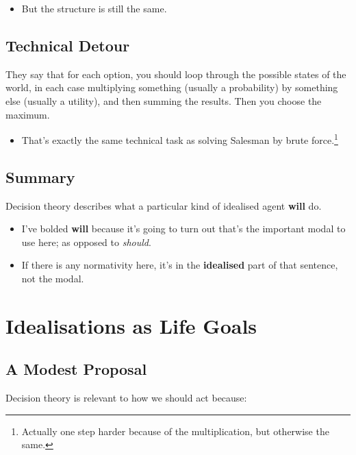 \documentclass[
  letterpaper,
  DIV=11,
  numbers=noendperiod]{scrartcl}
\providecommand{\tightlist}{%
  \setlength{\itemsep}{0pt}\setlength{\parskip}{0pt}}\usepackage{longtable,booktabs,array}
\begin{document}
\begin{itemize}
\tightlist
\item
  But the structure is still the same.
\end{itemize}

\subsection{Technical Detour}\label{technical-detour-1}

They say that for each option, you should loop through the possible
states of the world, in each case multiplying something (usually a
probability) by something else (usually a utility), and then summing the
results. Then you choose the maximum.

\begin{itemize}
\tightlist
\item
  That's exactly the same technical task as solving Salesman by brute
  force.\footnote{Actually one step harder because of the
    multiplication, but otherwise the same.}
\end{itemize}

\subsection{Summary}\label{summary}

Decision theory describes what a particular kind of idealised agent
\textbf{will} do.

\begin{itemize}
\tightlist
\item
  I've bolded \textbf{will} because it's going to turn out that's the
  important modal to use here; as opposed to \emph{should}.
\item
  If there is any normativity here, it's in the \textbf{idealised} part
  of that sentence, not the modal.
\end{itemize}

\section{Idealisations as Life Goals}\label{idealisations-as-life-goals}

\subsection{A Modest Proposal}\label{a-modest-proposal}

Decision theory is relevant to how we should act because:
\end{document}
